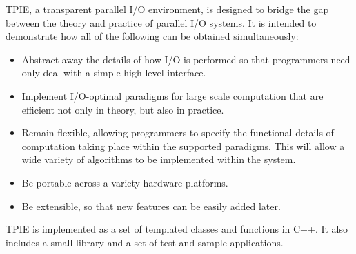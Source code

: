 

TPIE, a transparent parallel I/O environment, is designed to bridge the gap
between the theory and practice of parallel I/O systems. It is intended to
demonstrate how all of the following can be obtained simultaneously:

\begin{itemize}
\item Abstract away the details of how I/O is performed so that programmers
need only deal with a simple high level interface.
\item Implement I/O-optimal paradigms for large scale computation that are
efficient not only in theory, but also in practice.
\item Remain flexible, allowing programmers to specify the functional
details of computation taking place within the supported paradigms.  This
will allow a wide variety of algorithms to be implemented within the
system.
\item Be portable across a variety hardware platforms.
\item Be extensible, so that new features can be easily added later.
\end{itemize}

TPIE is implemented as a set of templated classes and functions in
C++. It also includes a small library and a set of test and
sample applications. 


